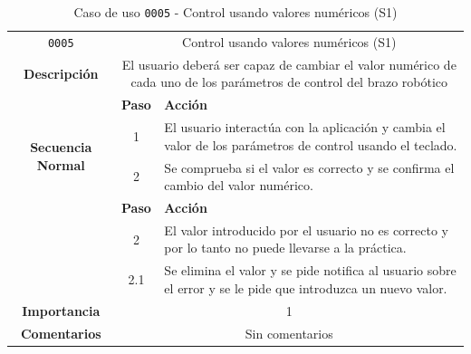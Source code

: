 \begin{table}[H]
    \centering
    \begin{tabularx}{\textwidth}{|c|c|X|}
        \cline{1-3}
        \texttt{0005}                              & \multicolumn{2}{c|}{Control usando valores numéricos (S1)}                                                                                                                      \\ \cline{1-3}
        \textbf{Descripción}                       & \multicolumn{2}{m{13cm}|}{El usuario deberá ser capaz de cambiar el valor numérico de cada uno de los parámetros de control del brazo robótico}
        \\ \cline{1-3}
        \multirow{4}{*}{\textbf{Secuencia Normal}} & \textbf{Paso}                                                                                                                                        & \textbf{Acción}
        \\ \cline{2-3}                    &   1  & El usuario interactúa con la aplicación y cambia el valor de los parámetros de control usando el teclado.
        \\ \cline{2-3}                    &   2  & Se comprueba si el valor es correcto y se confirma el cambio del valor numérico.
        \\ \cline{1-3}
        \multirow{2}{*}{\textbf{Excepciones}} & \textbf{Paso}  & \textbf{Acción}
        \\ \cline{2-3}                        &   2  & El valor introducido por el usuario no es correcto y por lo tanto no puede llevarse a la práctica.
        \\ \cline{2-3} 
                                              &  2.1 & Se elimina el valor y se pide notifica al usuario sobre el error y se le pide que introduzca un nuevo valor.
        \\ \cline{1-3}
        \textbf{Importancia}                       & \multicolumn{2}{c|}{1}                                                                                                                                                 \\ \cline{1-3}
        \textbf{Comentarios}                       & \multicolumn{2}{c|}{Sin comentarios}                                                                                                                                   \\ \cline{1-3}
    \end{tabularx}
    \caption{Caso de uso \texttt{0005} - Control usando valores numéricos (S1)}
\end{table}

